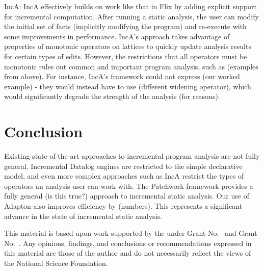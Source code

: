 \documentclass[acmlarge,anonymous]{acmart}\settopmatter{printfolios=true}
\begin{document}
IncA: IncA effectively builds on work like that in Flix by adding explicit support for incremental computation. After running a static analysis, the user can modify the initial set of facts (implicitly modifying the program) and re-execute with some improvements in performance. IncA's approach takes advantage of properties of monotonic operators on lattices to quickly update analysis results for certain types of edits. However, the restrictions that all operators must be monotonic rules out common and important program analysis, such as (examples from above). For instance, IncA's framework could not express (our worked example) - they would instead have to use (different widening operator), which would significantly degrade the strength of the analysis (for reasons).

\section{Conclusion}

Existing state-of-the-art approaches to incremental program analysis are not fully general. Incremental Datalog engines are restricted to the simple declarative model, and even more complex approaches such as IncA restrict the types of operators an analysis user can work with. The Patchwork framework provides a fully general (is this true?) approach to incremental static analysis. Our use of Adapton also improves efficiency by (numbers). This represents a significant advance in the state of incremental static analysis.



\begin{acks}                            %
  This material is based upon work supported by the
   under Grant
  No.~ and Grant
  No.~.  Any opinions, findings, and
  conclusions or recommendations expressed in this material are those
  of the author and do not necessarily reflect the views of the
  National Science Foundation.
\end{acks}
\end{document}
